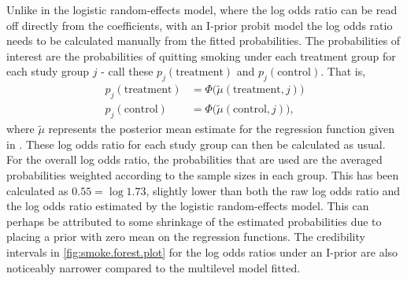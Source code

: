 \documentclass[a4paper,showframe,11pt]{report}\usepackage[]{graphicx}\usepackage[]{color}
\begin{document}
Unlike in the logistic random-effects model, where the log odds ratio can be read off directly from the coefficients, with an I-prior probit model the log odds ratio needs to be calculated manually from the fitted probabilities.
The probabilities of interest are the probabilities of quitting smoking under each treatment group for each study group $j$ - call these $p_j(\text{treatment})$ and $p_j(\text{control})$.
That is,
\begin{align*}
  p_j(\text{treatment}) &= \Phi\big( \tilde\mu(\text{treatment}, j) \big) \\
  p_j(\text{control})   &= \Phi\big( \tilde\mu(\text{control}, j) \big),
\end{align*}
where $\tilde \mu$ represents the posterior mean estimate for the regression function given in .
These log odds ratio for each study group can then be calculated as usual.
For the overall log odds ratio, the probabilities that are used are the averaged probabilities weighted according to the sample sizes in each group.
This has been calculated as $0.55 = \log 1.73$, slightly lower than both the raw log odds ratio and the log odds ratio estimated by the logistic random-effects model.
This can perhaps be attributed to some shrinkage of the estimated probabilities due to placing a prior with zero mean on the regression functions.
The credibility intervals in \cref{fig:smoke.forest.plot} for the log odds ratios under an I-prior are also noticeably narrower compared to the multilevel model fitted.
\end{document}

